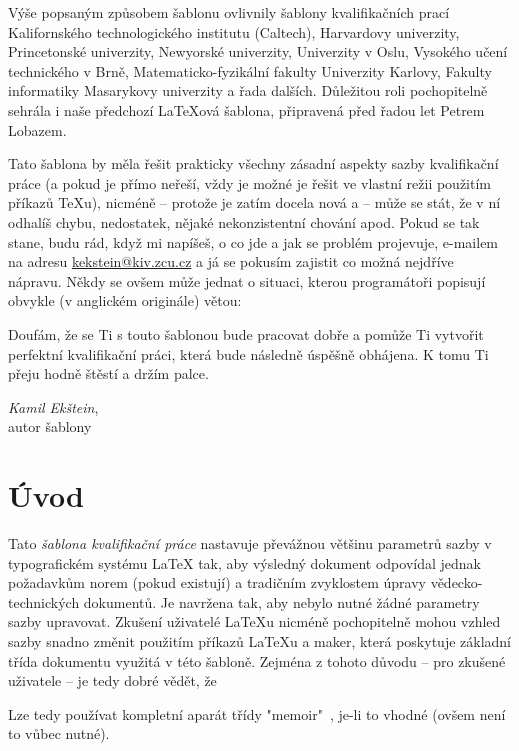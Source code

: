 \documentclass[czech, ing, kiv, he, iso690alph]{fasthesis}
\begin{document}
Výše popsaným způsobem šablonu ovlivnily šablony kvalifikačních prací Kalifornského technologického institutu (Caltech), Harvardovy univerzity, Princetonské univerzity, Newyorské univerzity, Univerzity v Oslu, Vysokého učení technického v Brně, Matematicko-fyzikální fakulty Univerzity Karlovy, Fakulty informatiky Masarykovy univerzity a řada dalších. Důležitou roli pochopitelně sehrála i naše předchozí \LaTeX{}ová šablona, připravená před řadou let Petrem Lobazem.

Tato šablona by měla řešit prakticky všechny zásadní aspekty sazby kvalifikační práce (a pokud je přímo neřeší, vždy je možné je řešit ve vlastní režii použitím příkazů \TeX{}u), nicméně -- protože je zatím docela nová a  -- může se stát, že v ní odhalíš chybu, nedostatek, nějaké nekonzistentní chování apod. Pokud se tak stane, budu rád, když mi napíšeš, o co jde a jak se problém projevuje, e-mailem na adresu \url{kekstein@kiv.zcu.cz} a já se pokusím zajistit co možná nejdříve nápravu. Někdy se ovšem může jednat o situaci, kterou programátoři popisují obvykle (v anglickém originále) větou: 

Doufám, že se Ti s touto šablonou bude pracovat dobře a pomůže Ti vytvořit perfektní kvalifikační práci, která bude následně úspěšně obhájena. K tomu Ti přeju hodně štěstí a držím palce.

\begin{flushright}
\textit{Kamil Ekštein},\\
autor šablony
\end{flushright}
%
%
%
%
\chapter{Úvod}
Tato \emph{šablona kvalifikační práce} nastavuje převážnou většinu parametrů sazby v typografickém systému \LaTeX{} tak, aby výsledný dokument odpovídal jednak požadavkům norem (pokud existují) a tradičním zvyklostem úpravy vědecko-technických dokumentů. Je navržena tak, aby nebylo nutné žádné parametry sazby  upravovat. Zkušení uživatelé \LaTeX{}u nicméně pochopitelně mohou vzhled sazby snadno změnit použitím příkazů \LaTeX{}u a maker, která poskytuje základní třída dokumentu využitá v této šabloně. Zejména z tohoto důvodu -- pro zkušené uživatele -- je tedy dobré vědět, že
\begin{center}
\end{center}
Lze tedy používat kompletní aparát třídy \filename"memoir"~\cite{memoir}, je-li to vhodné (ovšem není to vůbec nutné).
\end{document}
